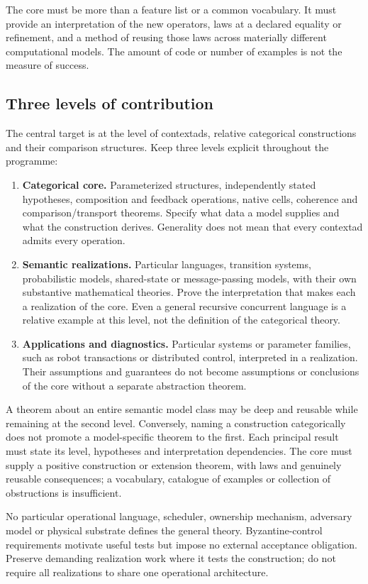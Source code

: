 \documentclass[11pt,a4paper]{article}
\begin{document}
The core must be more than a feature list or a common vocabulary. It must provide an interpretation of the new operators, laws at a declared equality or refinement, and a method of reusing those laws across materially different computational models. The amount of code or number of examples is not the measure of success.

\subsection{Three levels of contribution}\label{sec:levels}
The central target is at the level of contextads, relative categorical constructions and their comparison structures. Keep three levels explicit throughout the programme:
\begin{enumerate}
\item \textbf{Categorical core.} Parameterized structures, independently stated hypotheses, composition and feedback operations, native cells, coherence and comparison/transport theorems. Specify what data a model supplies and what the construction derives. Generality does not mean that every contextad admits every operation.
\item \textbf{Semantic realizations.} Particular languages, transition systems, probabilistic models, shared-state or message-passing models, with their own substantive mathematical theories. Prove the interpretation that makes each a realization of the core. Even a general recursive concurrent language is a relative example at this level, not the definition of the categorical theory.
\item \textbf{Applications and diagnostics.} Particular systems or parameter families, such as robot transactions or distributed control, interpreted in a realization. Their assumptions and guarantees do not become assumptions or conclusions of the core without a separate abstraction theorem.
\end{enumerate}
A theorem about an entire semantic model class may be deep and reusable while remaining at the second level. Conversely, naming a construction categorically does not promote a model-specific theorem to the first. Each principal result must state its level, hypotheses and interpretation dependencies. The core must supply a positive construction or extension theorem, with laws and genuinely reusable consequences; a vocabulary, catalogue of examples or collection of obstructions is insufficient.

No particular operational language, scheduler, ownership mechanism, adversary model or physical substrate defines the general theory. Byzantine-control requirements motivate useful tests but impose no external acceptance obligation. Preserve demanding realization work where it tests the construction; do not require all realizations to share one operational architecture.
\end{document}
